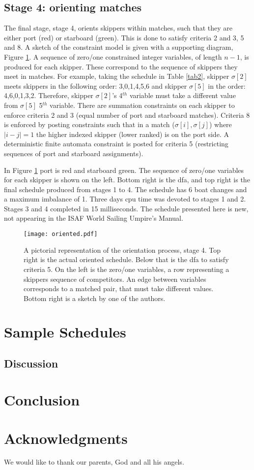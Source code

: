 \documentclass{llncs}
\begin{document}
\subsection{Stage 4: orienting matches}
The final stage, stage 4, orients skippers within matches, such that they are either port (red) or starboard (green). This is done to satisfy criteria 2 and 3, 5 and 8. A sketch of the constraint model is given with a supporting diagram, Figure \ref{oriented}.  A sequence of zero/one constrained integer variables, of length $n-1$, is produced for each skipper. These correspond to the sequence of skippers they meet in matches. For example, taking the schedule in Table \ref{tab2}, skipper $\sigma[{2}]$ meets skippers in the following order: 3,0,1,4,5,6 and skipper $\sigma[{5}]$ in the order: 4,6,0,1,3,2. Therefore, skipper $\sigma[{2}]$'s 4$^{th}$ variable must take a different value from $\sigma[{5}]$ 5$^{th}$ variable. There are summation constraints on each skipper to enforce criteria 2 and 3 (equal number of port and starboard matches). Criteria 8 is enforced by posting constraints such that in a match ($\sigma[{i}],\sigma[{j}]$) where $|i - j| = 1$ the higher indexed skipper (lower ranked) is on the port side. A deterministic finite automata constraint is posted for criteria 5 (restricting sequences of port and starboard assignments). 

In Figure \ref{oriented} port is red and starboard green. The sequence of zero/one variables for each skipper is shown on the left. Bottom right is the dfa, and top right is the final schedule produced from stages 1 to 4. The schedule has 6 boat changes and a maximum imbalance of 1. Three days cpu time was devoted to stages 1 and 2. Stages 3 and 4 completed in 15 milliseconds. The schedule presented here is new, not appearing in the ISAF World Sailing Umpire's Manual.
\begin{figure}[h]
\centering
\texttt{[image: oriented.pdf]}
\caption{A pictorial representation of the orientation process, stage 4. Top right is the actual oriented schedule. Below that is the dfa to satisfy criteria 5. On the left is the zero/one variables, a row representing a skippers sequence of competitors. An edge between variables corresponds to a matched pair, that must take different values. Bottom right is a sketch by one of the authors.}
\label{oriented} 
\end{figure}

\section{Sample Schedules}

\subsection{Discussion}

\section{Conclusion}

\section*{Acknowledgments}
We would like to thank our parents, God and all his angels.



\end{document}
